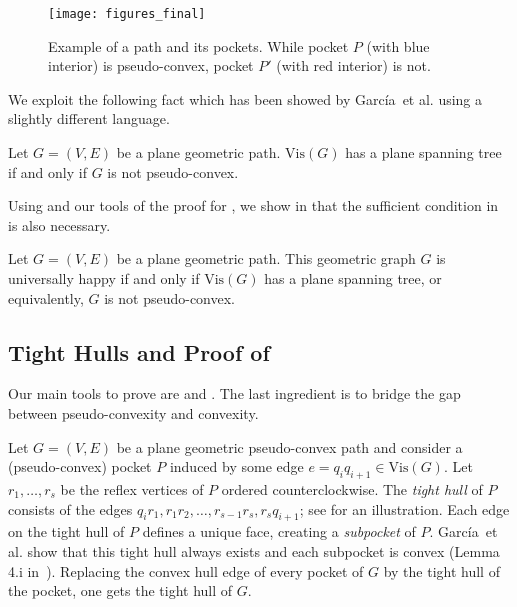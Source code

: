 \documentclass[a4paper,runningheads,cleveref,thm-restate]{lipics-v2021}
\newcommand{\Vis}[1]{\ensuremath{\mathrm{Vis}(#1)}}
\newcommand{\pseudoconvex}{pseudo-convex\xspace}
\newcommand{\etal}{{et al.}\xspace}
\begin{document}
\begin{figure}[hbt]
	\centering
		\texttt{[image: figures\_final]}
	\caption{
		Example of a path and its pockets.  While pocket $P$ (with blue interior) is  \pseudoconvex, pocket $P'$ (with red interior) is not.}
	\label{fig:qConvexA}
\end{figure}

We exploit the following fact which has been showed by Garc\'ia~\etal\cite{GARCIA2014} using a slightly different language.

\begin{lemma}\label{thm:spanningTree}
	Let $G=(V,E)$ be a plane geometric path. \Vis{G} has a plane spanning tree if and only if $G$ is not \pseudoconvex.
\end{lemma}

Using  and our tools of the proof for , we show in  that the sufficient condition in  is also necessary.

\begin{theorem}
\label{thm:univHappinessPaths}
	Let $G=(V,E)$ be a plane geometric path. This geometric graph $G$ is universally happy if and only if \Vis{G} has a plane spanning tree, or equivalently, $G$ is not pseudo-convex.
\end{theorem}



\subsection{Tight Hulls and Proof of }
Our main tools to prove  are  and . The last ingredient is to bridge the gap between \pseudoconvex{ity} and convexity.

{Let $G = (V,E)$ be a plane geometric \pseudoconvex path and consider a} (\pseudoconvex) pocket $P$ induced by some edge $e = q_{i}q_{i+1} \in \Vis{G}$.  Let $r_{1}, \dots, r_{s}$ be the reflex vertices of $P$ ordered counterclockwise. 
The \emph{tight hull} of $P$ consists of the edges $q_{i}r_{1},r_{1}r_{2}, \dots, r_{s-1}r_{s}, r_{s}q_{i+1}$; see  for an illustration. 
Each edge on the tight hull of $P$ defines a unique face, creating a \emph{subpocket} of $P$. 
Garc\'ia~\etal\cite{GARCIA2014} show that this tight hull always exists and each subpocket is convex (Lemma 4.i in~\cite{GARCIA2014}). Replacing the convex hull edge of every pocket of $G$ by the tight hull of the pocket, one gets the tight hull of $G$. 
\end{document}
